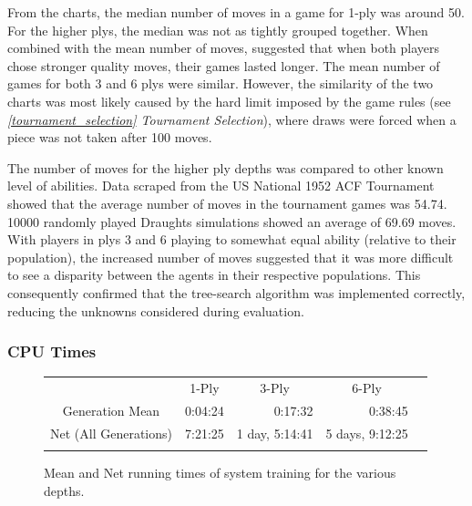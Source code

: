 \documentclass[12pt,a4paper]{article}
\begin{document}
            From the charts, the median number of moves in a game for 1-ply was around 50. For the higher plys, the median was not as tightly grouped together. When combined with the mean number of moves, suggested that when both players chose stronger quality moves, their games lasted longer. The mean number of games for both 3 and 6 plys were similar. However, the similarity of the two charts was most likely caused by the hard limit imposed by the game rules (see \textit{\ref{tournament_selection} Tournament Selection}), where draws were forced when a piece was not taken after 100 moves. 

            The number of moves for the higher ply depths was compared to other known level of abilities. Data scraped from the US National 1952 ACF Tournament \cite{loy_us_1952} showed that the average number of moves in the tournament games was 54.74. 10000 randomly played Draughts simulations showed an average of 69.69 moves. With players in plys 3 and 6 playing to somewhat equal ability (relative to their population), the increased number of moves suggested that it was more difficult to see a disparity between the agents in their respective populations. This consequently confirmed that the tree-search algorithm was implemented correctly, reducing the unknowns considered during evaluation.

        \subsubsection{CPU Times}

        \begin{figure}[!ht]
            \centering
    
                \begin{tabular}{ccccc}
                       & 1-Ply        & 3-Ply          & 6-Ply          & \\ \cline{2-4}
                \multicolumn{1}{c|}{Generation Mean} & \multicolumn{1}{r|}{0:04:24} & \multicolumn{1}{r|}{0:17:32}  & \multicolumn{1}{r|}{0:38:45}   & \\ \cline{2-4}
                \multicolumn{1}{c|}{Net (All Generations)} & \multicolumn{1}{r|}{7:21:25} & \multicolumn{1}{r|}{1 day, 5:14:41} & \multicolumn{1}{r|}{5 days, 9:12:25} & \\ \cline{2-4}
                       &          &           &            & 
                \end{tabular}
    
            \caption{Mean and Net running times of system training for the various depths. \label{cpu_table}}
            \end{figure}
\end{document}
